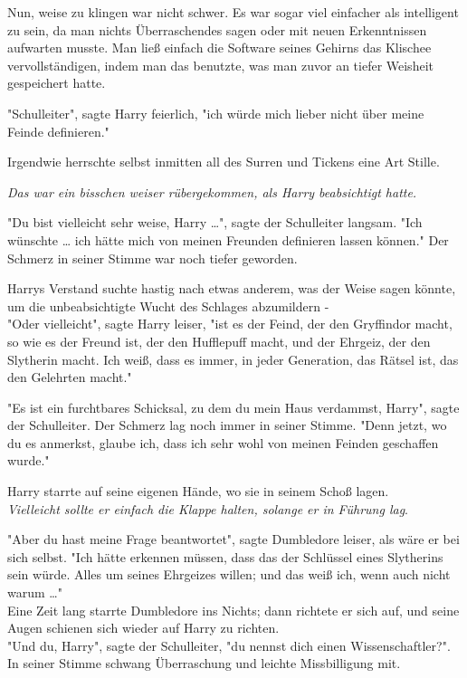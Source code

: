 {Nun, weise zu klingen war nicht schwer. Es war sogar viel einfacher als intelligent zu sein, da man nichts Überraschendes sagen oder mit neuen Erkenntnissen aufwarten musste. Man ließ einfach die Software seines Gehirns das Klischee vervollständigen, indem man das benutzte, was man zuvor an tiefer Weisheit gespeichert hatte.

"Schulleiter", sagte Harry feierlich, "ich würde mich lieber nicht über meine Feinde definieren."

Irgendwie herrschte selbst inmitten all des Surren und Tickens eine Art Stille.

\emph{Das war ein bisschen weiser rübergekommen, als Harry beabsichtigt hatte.}

"Du bist vielleicht sehr weise, Harry …", sagte der Schulleiter langsam. "Ich wünschte … ich hätte mich von meinen Freunden definieren lassen können." Der Schmerz in seiner Stimme war noch tiefer geworden.

Harrys Verstand suchte hastig nach etwas anderem, was der Weise sagen könnte, um die unbeabsichtigte Wucht des Schlages abzumildern -\\ "Oder vielleicht", sagte Harry leiser, "ist es der Feind, der den Gryffindor macht, so wie es der Freund ist, der den Hufflepuff macht, und der Ehrgeiz, der den Slytherin macht. Ich weiß, dass es immer, in jeder Generation, das Rätsel ist, das den Gelehrten macht."

"Es ist ein furchtbares Schicksal, zu dem du mein Haus verdammst, Harry", sagte der Schulleiter. Der Schmerz lag noch immer in seiner Stimme. "Denn jetzt, wo du es anmerkst, glaube ich, dass ich sehr wohl von meinen Feinden geschaffen wurde."

Harry starrte auf seine eigenen Hände, wo sie in seinem Schoß lagen.\\ \emph{Vielleicht sollte er einfach die Klappe halten, solange er in Führung lag}.

"Aber du hast meine Frage beantwortet", sagte Dumbledore leiser, als wäre er bei sich selbst. "Ich hätte erkennen müssen, dass das der Schlüssel eines Slytherins sein würde. Alles um seines Ehrgeizes willen; und das weiß ich, wenn auch nicht warum …"\\ Eine Zeit lang starrte Dumbledore ins Nichts; dann richtete er sich auf, und seine Augen schienen sich wieder auf Harry zu richten.\\ "Und du, Harry", sagte der Schulleiter, "du nennst dich einen Wissenschaftler?".\\ In seiner Stimme schwang Überraschung und leichte Missbilligung mit.

}
